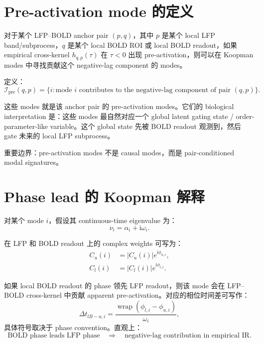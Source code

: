 \documentclass[11pt,a4paper]{ctexart}
\begin{document}
\section{Pre-activation mode 的定义}

对于某个 LFP--BOLD anchor pair $(p,q)$，其中 $p$ 是某个 local LFP band/subprocess，$q$ 是某个 local BOLD ROI 或 local BOLD readout，如果 empirical cross-kernel $h_{q,p}(\tau)$ 在 $\tau<0$ 出现 pre-activation，则可以在 Koopman modes 中寻找贡献这个 negative-lag component 的 modes。

定义：
\begin{equation}
    \mathcal I_{\mathrm{pre}}(q,p)
    =
    \{i: \text{mode } i \text{ contributes to the negative-lag component of pair }(q,p)\}.
\end{equation}

这些 modes 就是该 anchor pair 的 pre-activation modes。它们的 biological interpretation 是：这些 modes 最自然对应一个 global latent gating state / order-parameter-like variable。这个 global state 先被 BOLD readout 观测到，然后 gate 未来的 local LFP subprocess。

重要边界：pre-activation modes 不是 causal modes，而是 pair-conditioned modal signatures。

\section{Phase lead 的 Koopman 解释}

对某个 mode $i$，假设其 continuous-time eigenvalue 为：
\begin{equation}
    \nu_i=\alpha_i+\mathrm{i}\omega_i.
\end{equation}

在 LFP 和 BOLD readout 上的 complex weights 可写为：
\begin{align}
    C_u(i) &= |C_u(i)|e^{\mathrm{i}\phi_{u,i}}, \\
    C_l(i) &= |C_l(i)|e^{\mathrm{i}\phi_{l,i}}.
\end{align}

如果 local BOLD readout 的 phase 领先 LFP readout，则该 mode 会在 LFP--BOLD cross-kernel 中贡献 apparent pre-activation。对应的相位时间差可写作：
\begin{equation}
    \Delta t_{lB-u,i}
    =
    \frac{\operatorname{wrap}(\phi_{l,i}-\phi_{u,i})}{\omega_i},
\end{equation}
具体符号取决于 phase convention。直观上：
\begin{equation}
    \text{BOLD phase leads LFP phase}
    \quad \Rightarrow \quad
    \text{negative-lag contribution in empirical IR}.
\end{equation}
\end{document}
